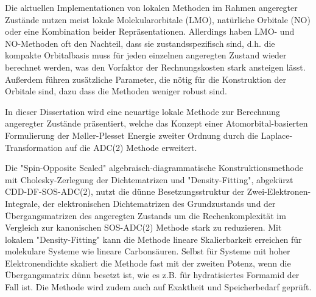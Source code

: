 Die aktuellen Implementationen von lokalen Methoden im Rahmen angeregter Zustände nutzen meist lokale Molekularorbitale (LMO), natürliche Orbitale (NO) oder eine Kombination beider Repräsentationen.
Allerdings haben LMO- und NO-Methoden oft den Nachteil, dass sie zustandsspezifisch sind, d.h. die kompakte Orbitalbasis muss für jeden einzelnen angeregten Zustand wieder berechnet werden, was den Vorfaktor der Rechnungskosten stark ansteigen lässt. 
Au{\ss}erdem führen zusätzliche Parameter, die nötig für die Konstruktion der Orbitale sind, dazu dass die Methoden weniger robust sind. 

In dieser Dissertation wird eine neuartige lokale Methode zur Berechnung angeregter Zustände präsentiert, welche das Konzept einer Atomorbital-basierten Formulierung der M{\o}ller-Plesset Energie zweiter Ordnung durch die Laplace-Transformation auf die ADC(2) Methode erweitert.

Die "{}Spin-Opposite Scaled"{} algebraisch-diagrammatische Konstruktionsmethode mit Cholesky-Zerlegung der Dichtematrizen und "{}Density-Fitting"{}, abgekürzt CDD-DF-SOS-ADC(2), nutzt die dünne Besetzungsstruktur der Zwei-Elektronen-Integrale, der elektronischen Dichtematrizen des Grundzustands und der Übergangsmatrizen des angeregten Zustands um die Rechenkomplexität im Vergleich zur kanonischen SOS-ADC(2) Methode stark zu reduzieren.
Mit lokalem "{}Density-Fitting"{} kann die Methode lineare Skalierbarkeit erreichen für molekulare Systeme wie lineare Carbonsäuren. 
Selbst für Systeme mit hoher Elektronendichte skaliert die Methode fast mit der zweiten Potenz, wenn die Übergangsmatrix dünn besetzt ist, wie es z.B. für hydratisiertes Formamid der Fall ist.
Die Methode wird zudem auch auf Exaktheit und Speicherbedarf geprüft. 

